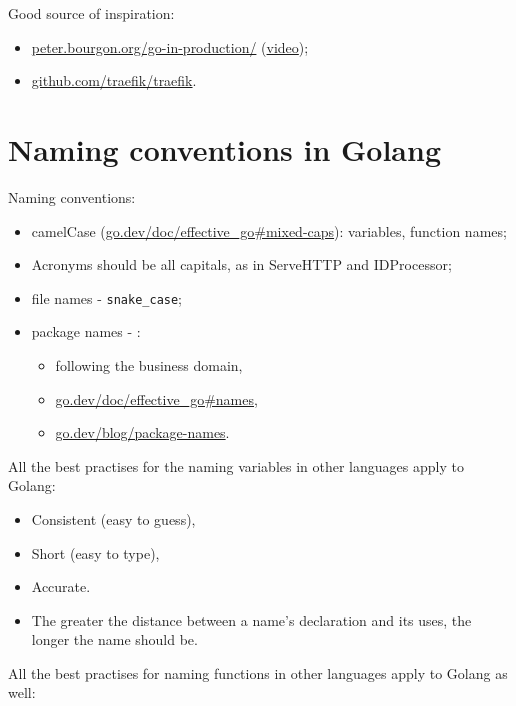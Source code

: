 \documentclass[11pt, letterpaper]{article}
\begin{document}
Good source of inspiration:

\begin{itemize}%
\item \href{https://peter.bourgon.org/go-in-production/}{peter.bourgon.org/go-in-production/} (\href{https://www.youtube.com/watch?v=PTE4VJIdHPg}{video});
\item \href{https://github.com/traefik/traefik}{github.com/traefik/traefik}.
\end{itemize}%

\section{Naming conventions in Golang}

Naming conventions:

\begin{itemize}%
\item camelCase (\href{https://go.dev/doc/effective\_go\#mixed-caps}{go.dev/doc/effective\_go\#mixed-caps}): variables, function names;
\item Acronyms should be all capitals, as in ServeHTTP and IDProcessor;
\item file names - \verb|snake_case|;
\item package names - : \begin{itemize}%
\item following the business domain,
\item \href{https://go.dev/doc/effective\_go\#names}{go.dev/doc/effective\_go\#names},
\item \href{https://go.dev/blog/package-names}{go.dev/blog/package-names}.
\end{itemize}%
\end{itemize}%

All the best practises for the naming variables in other languages apply to Golang:

\begin{itemize}%
\item Consistent (easy to guess),
\item Short (easy to type),
\item Accurate.
\item The greater the distance between a name's declaration and its uses, 
the longer the name should be.
\end{itemize}%

All the best practises for naming functions in other languages apply to Golang as well:
\end{document}
